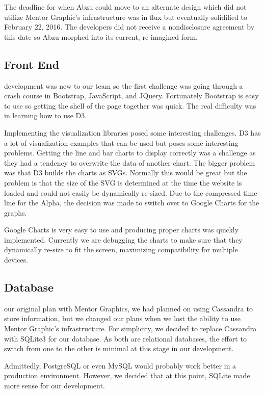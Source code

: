 \documentclass[journal]{IEEEtran}
\begin{document}
The deadline for when Abzu could move to an alternate design which did not utilize Mentor Graphic's infrastructure was in flux but eventually solidified to February 22, 2016. The developers did not receive a nondisclosure agreement by this date so Abzu morphed into its current, re-imagined form.

\subsection{Front End}
 development was new to our team so the first challenge was going through a crash course in Bootstrap, JavaScript, and JQuery. Fortunately Bootstrap is easy to use so getting the shell of the page together was quick. The real difficulty was in learning how to use D3.

Implementing the visualization libraries posed some interesting challenges. D3 has a lot of visualization examples that can be used but poses some interesting problems. Getting the line and bar charts to display correctly was a challenge as they had a tendency to overwrite the data of another chart. The bigger problem was that D3 builds the charts as SVGs. Normally this would be great but the problem is that the size of the SVG is determined at the time the website is loaded and could not easily be dynamically re-sized. Due to the compressed time line for the Alpha, the decision was made to switch over to Google Charts for the graphs.

Google Charts is very easy to use and producing proper charts was quickly implemented. Currently we are debugging the charts to make sure that they dynamically re-size to fit the screen, maximizing compatibility for multiple devices.


\subsection{Database}
 our original plan with Mentor Graphics, we had planned on using Cassandra to store information, but we changed our plans when we lost the ability to use Mentor Graphic's infrastructure. For simplicity, we decided to replace Cassandra with SQLite3 for our database. As both are relational databases, the effort to switch from one to the other is minimal at this stage in our development. 

Admittedly, PostgreSQL or even MySQL would probably work better in a production environment. However, we decided that at this point, SQLite made more sense for our development.  
\end{document}
